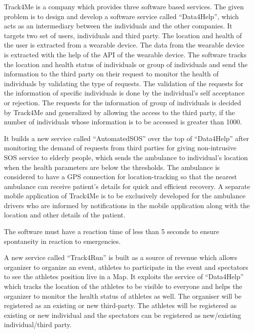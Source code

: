 Track4Me is a company which provides three software based services. The given problem is to design and develop a software service called  “Data4Help”,  which acts as an intermediary between the individuals and the other companies. It targets two set of users, individuals and third party. The location and health of the user is extracted from a wearable device. The data from the wearable device is extracted with the help of the API of the wearable device. The software tracks the location and health status of individuals or group of individuals and send the information to the third party on their request to monitor the health of individuals by validating the type of requests. The validation of the requests for the information of specific individuals is done by the individual’s self acceptance or rejection. The requests for the information of group of individuals is decided by Track4Me and generalized by allowing the access to the third party, if the number of individuals whose information is to be accessed is greater than 1000.

It builds a new service called “AutomatedSOS” over the top of “Data4Help” after monitoring the demand of requests from third parties for giving non-intrusive SOS service to elderly people, which sends the ambulance to individual’s location when the health parameters are below the thresholds.
 The ambulance is considered to have a GPS connection for location-tracking so that the nearest ambulance can receive patient’s details for quick and efficient recovery. A separate mobile application of Track4Me is to be exclusively developed for the ambulance drivers who are informed by notifications in the mobile application along with the location and other details of the patient. 

The software must have a reaction time of less than 5 seconds to ensure spontaneity in reaction to emergencies.

A new service called “Track4Run” is built as a source of revenue which allows organizer to organize an event, athletes to participate in the event and spectators to see the athletes position live in a Map. It exploits the service of “Data4Help” which tracks the location of the athletes to be visible to everyone and helps the organizer to monitor the health status of athletes as well. The organiser will be registered as an existing or new third-party. The athletes will be registered as existing or new individual and the spectators can be registered as new/existing individual/third party.


